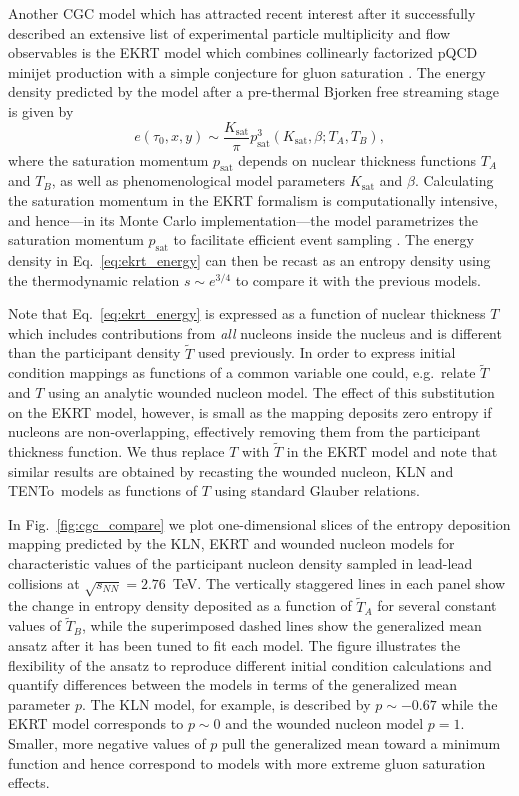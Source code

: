 \documentclass[aps,prc,reprint,amsmath,nofootinbib]{revtex4-1}
\newcommand{\trento}{T\raisebox{-0.5ex}{R}ENTo}
\newcommand{\sqrts}{\sqrt{s_{NN}}}
\newcommand{\T}{\tilde{T}}
\begin{document}
Another CGC model which has attracted recent interest after it successfully described an extensive list of experimental particle multiplicity and flow observables \cite{Niemi:2015qia, Paatelainen:2013eea} is the EKRT model which combines collinearly factorized pQCD minijet production with a simple conjecture for gluon saturation \cite{Eskola:1999fc, Eskola:2001bf}.
The energy density predicted by the model after a pre-thermal Bjorken free streaming stage is given by
\begin{equation}
  e(\tau_0, x, y) \sim \frac{K_\text{sat}}{\pi} p_\text{sat}^3(K_\text{sat}, \beta; T_A, T_B),
  \label{eq:ekrt_energy}
\end{equation}
where the saturation momentum $p_\text{sat}$ depends on nuclear thickness functions $T_A$ and $T_B$, as well as phenomenological model parameters $K_\text{sat}$ and $\beta$.
Calculating the saturation momentum in the EKRT formalism is computationally intensive, and hence---in its Monte Carlo implementation---the model parametrizes the saturation momentum $p_\text{sat}$ to facilitate efficient event sampling \cite{Niemi:2015qia}. 
The energy density in Eq.~\eqref{eq:ekrt_energy} can then be recast as an entropy density using the thermodynamic relation ${s \sim e^{3/4}}$ to compare it with the previous models.

Note that Eq.~\eqref{eq:ekrt_energy} is expressed as a function of nuclear thickness $T$ which includes contributions from \emph{all} nucleons inside the nucleus and is different than the participant density $\T$ used previously.
In order to express initial condition mappings as functions of a common variable one could, e.g.\ relate $\T$ and $T$ using an analytic wounded nucleon model.
The effect of this substitution on the EKRT model, however, is small as the mapping deposits zero entropy if nucleons are non-overlapping, effectively removing them from the participant thickness function.
We thus replace $T$ with $\T$ in the EKRT model and note that similar results are obtained by recasting the wounded nucleon, KLN and \trento\ models as functions of $T$ using standard Glauber relations.

In Fig.~\ref{fig:cgc_compare} we plot one-dimensional slices of the entropy deposition mapping predicted by the KLN, EKRT and wounded nucleon models for characteristic values of the participant nucleon density sampled in lead-lead collisions at $\sqrts=2.76$~TeV.
The vertically staggered lines in each panel show the change in entropy density deposited as a function of $\T_A$ for several constant values of $\T_B$, while the superimposed dashed lines show the generalized mean ansatz after it has been tuned to fit each model.
The figure illustrates the flexibility of the ansatz to reproduce different initial condition calculations and quantify differences between the models in terms of the generalized mean parameter $p$.
The KLN model, for example, is described by $p\sim-0.67$ while the EKRT model corresponds to $p \sim 0$ and the wounded nucleon model $p=1$.
Smaller, more negative values of $p$ pull the generalized mean toward a minimum function and hence correspond to models with more extreme gluon saturation effects.
\end{document}
